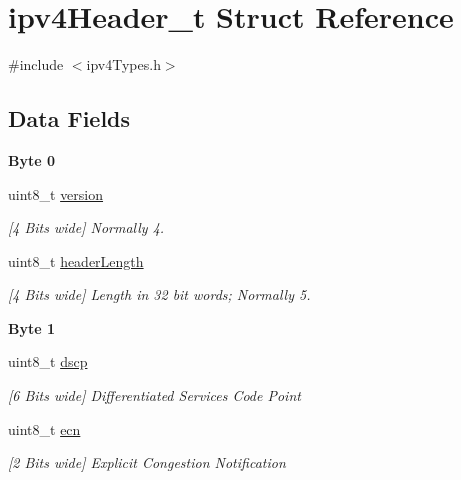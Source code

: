 \hypertarget{structipv4_header__t}{}\section{ipv4\+Header\+\_\+t Struct Reference}
\label{structipv4_header__t}


{\ttfamily \#include $<$ipv4\+Types.\+h$>$}

\subsection*{Data Fields}
\begin{Indent}\textbf{ Byte 0}\par
\begin{DoxyCompactItemize}
\item 
uint8\+\_\+t \mbox{\hyperlink{structipv4_header__t_ab22abc2906422da61885ac6c8e6a1a59}{version}}
\begin{DoxyCompactList}\small\item\em \mbox{[}4 Bits wide\mbox{]} Normally 4. \end{DoxyCompactList}\item 
uint8\+\_\+t \mbox{\hyperlink{structipv4_header__t_abf2b1d816d4e2e459b2ed1bda26cb904}{header\+Length}}
\begin{DoxyCompactList}\small\item\em \mbox{[}4 Bits wide\mbox{]} Length in 32 bit words; Normally 5. \end{DoxyCompactList}\end{DoxyCompactItemize}
\end{Indent}
\begin{Indent}\textbf{ Byte 1}\par
\begin{DoxyCompactItemize}
\item 
uint8\+\_\+t \mbox{\hyperlink{structipv4_header__t_af6c1c78d408e91d2916add663a491623}{dscp}}
\begin{DoxyCompactList}\small\item\em \mbox{[}6 Bits wide\mbox{]} Differentiated Services Code Point \end{DoxyCompactList}\item 
uint8\+\_\+t \mbox{\hyperlink{structipv4_header__t_afaf0e7ded50820ba5d7d11464707ce4c}{ecn}}
\begin{DoxyCompactList}\small\item\em \mbox{[}2 Bits wide\mbox{]} Explicit Congestion Notification \end{DoxyCompactList}\end{DoxyCompactItemize}
\end{Indent}
